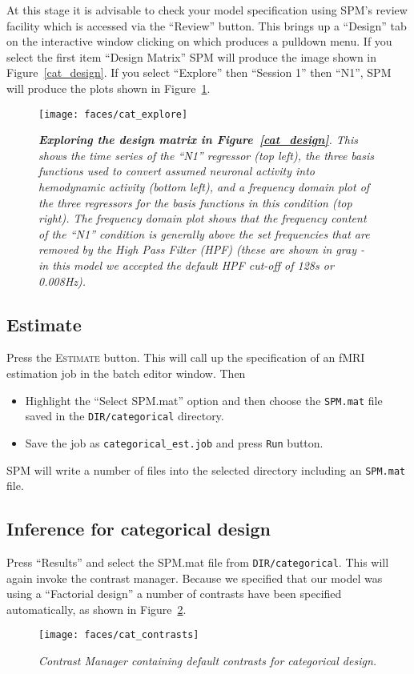 At this stage it is advisable to check your model specification using SPM's review facility which is accessed via the ``Review'' button. This brings up a ``Design'' tab on the interactive window clicking on which produces a pulldown menu. If you select the first item ``Design Matrix'' SPM will produce the image shown in Figure~\ref{cat_design}. If you select ``Explore'' then ``Session 1'' then ``N1'', SPM will produce the plots shown in Figure~\ref{cat_explore}.
\begin{figure}
\begin{center}
\texttt{[image: faces/cat\_explore]}
\caption{\em \textbf{Exploring the design matrix in Figure~\ref{cat_design}}. This shows the time series of the ``N1'' regressor (top left), the three basis functions used to convert assumed neuronal activity into hemodynamic activity (bottom left), and a frequency domain plot of the three regressors for the basis functions in this condition (top right). The frequency domain plot shows that the frequency content of the ``N1'' condition is generally above the set frequencies that are removed by the High Pass Filter (HPF) (these are shown in gray - in this model we accepted the default HPF cut-off of 128s or 0.008Hz). \label{cat_explore}}
\end{center}
\end{figure}

\subsection{Estimate}

Press the \textsc{Estimate} button. This will call up the specification of an fMRI estimation job in the batch editor window. Then
\begin{itemize}
\item Highlight the ``Select SPM.mat'' option and then choose the \texttt{SPM.mat} file saved in the \texttt{DIR/categorical} directory.
\item Save the job as \texttt{categorical\_est.job} and press \texttt{Run} button.
\end{itemize}
SPM will write a number of files into the selected directory including an \texttt{SPM.mat} file.

\subsection{Inference for categorical design}

Press ``Results'' and select the SPM.mat file from \texttt{DIR/categorical}. This will again invoke the contrast manager. Because we specified that our model was using a ``Factorial design'' a number of contrasts have been specified automatically, as shown in Figure~\ref{cat_contrasts}.
\begin{figure}
\begin{center}
\texttt{[image: faces/cat\_contrasts]}
\caption{\em Contrast Manager containing default contrasts for categorical design. \label{cat_contrasts}}
\end{center}
\end{figure}

